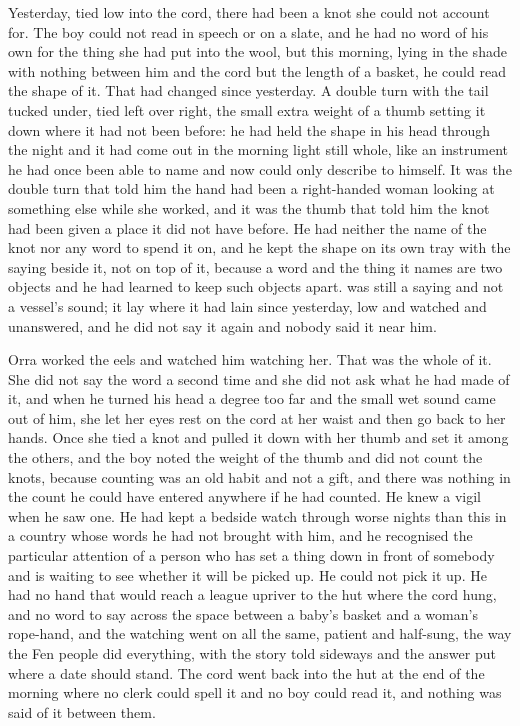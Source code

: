 Yesterday, tied low into the cord, there had been a knot she could not account for. The boy could not read  in speech or on a slate, and he had no word of his own for the thing she had put into the wool, but this morning, lying in the shade with nothing between him and the cord but the length of a basket, he could read the shape of it. That had changed since yesterday. A double turn with the tail tucked under, tied left over right, the small extra weight of a thumb setting it down where it had not been before: he had held the shape in his head through the night and it had come out in the morning light still whole, like an instrument he had once been able to name and now could only describe to himself. It was the double turn that told him the hand had been a right-handed woman looking at something else while she worked, and it was the thumb that told him the knot had been given a place it did not have before. He had neither the name of the knot nor any word to spend it on, and he kept the shape on its own tray with the saying beside it, not on top of it, because a word and the thing it names are two objects and he had learned to keep such objects apart.  was still a saying and not a vessel's sound; it lay where it had lain since yesterday, low and watched and unanswered, and he did not say it again and nobody said it near him.

Orra worked the eels and watched him watching her. That was the whole of it. She did not say the word a second time and she did not ask what he had made of it, and when he turned his head a degree too far and the small wet sound came out of him, she let her eyes rest on the cord at her waist and then go back to her hands. Once she tied a knot and pulled it down with her thumb and set it among the others, and the boy noted the weight of the thumb and did not count the knots, because counting was an old habit and not a gift, and there was nothing in the count he could have entered anywhere if he had counted. He knew a vigil when he saw one. He had kept a bedside watch through worse nights than this in a country whose words he had not brought with him, and he recognised the particular attention of a person who has set a thing down in front of somebody and is waiting to see whether it will be picked up. He could not pick it up. He had no hand that would reach a league upriver to the hut where the cord hung, and no word to say across the space between a baby's basket and a woman's rope-hand, and the watching went on all the same, patient and half-sung, the way the Fen people did everything, with the story told sideways and the answer put where a date should stand. The cord went back into the hut at the end of the morning where no clerk could spell it and no boy could read it, and nothing was said of it between them.

